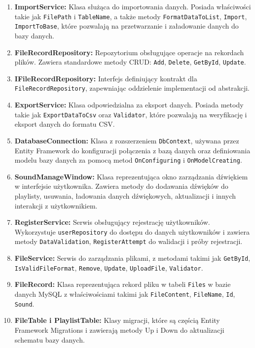 \begin{enumerate}
    \item \textbf{ ImportService:} Klasa służąca do importowania danych. Posiada właściwości takie jak \texttt{FilePath} i \texttt{TableName}, a także metody \texttt{FormatDataToList}, \texttt{Import}, \texttt{ImportToBase}, które pozwalają na przetwarzanie i załadowanie danych do bazy danych.
    \item \textbf{ FileRecordRepository:} Repozytorium obsługujące operacje na rekordach plików. Zawiera standardowe metody CRUD: \texttt{Add}, \texttt{Delete}, \texttt{GetById}, \texttt{Update}.
    \item \textbf{ IFileRecordRepository:} Interfejs definiujący kontrakt dla \texttt{FileRecordRepository}, zapewniając oddzielenie implementacji od abstrakcji.
    \item \textbf{ ExportService:} Klasa odpowiedzialna za eksport danych. Posiada metody takie jak \newline \texttt{ExportDataToCsv} oraz \texttt{Validator}, które pozwalają na weryfikację i eksport danych do formatu CSV.
    \item \textbf{ DatabaseConnection:} Klasa z rozszerzeniem \texttt{DbContext}, używana przez Entity Framework do konfiguracji połączenia z bazą danych oraz definiowania modelu bazy danych za pomocą metod \texttt{OnConfiguring} i \texttt{OnModelCreating}.
    \item \textbf{ SoundManageWindow:} Klasa reprezentująca okno zarządzania dźwiękiem w interfejsie użytkownika. Zawiera metody do dodawania dźwięków do playlisty, usuwania, ładowania danych dźwiękowych, aktualizacji i innych interakcji z użytkownikiem.
    \item \textbf{ RegisterService:} Serwis obsługujący rejestrację użytkowników. Wykorzystuje \texttt{userRepository} do dostępu do danych użytkowników i zawiera metody \texttt{DataValidation}, \texttt{RegisterAttempt} do walidacji i próby rejestracji.
    \item \textbf{ FileService:} Serwis do zarządzania plikami, z metodami takimi jak \texttt{GetById}, \newline \texttt{IsValidFileFormat}, \texttt{Remove}, \texttt{Update}, \texttt{UploadFile}, \texttt{Validator}.
    \item \textbf{ FileRecord:} Klasa reprezentująca rekord pliku w tabeli \texttt{Files} w bazie danych MySQL z właściwościami takimi jak \texttt{FileContent}, \texttt{FileName}, \texttt{Id}, \texttt{Sound}.
    \item \textbf{ FileTable i PlaylistTable:} Klasy migracji, które są częścią Entity Framework Migrations i zawierają metody Up i Down do aktualizacji schematu bazy danych.
\end{enumerate}

